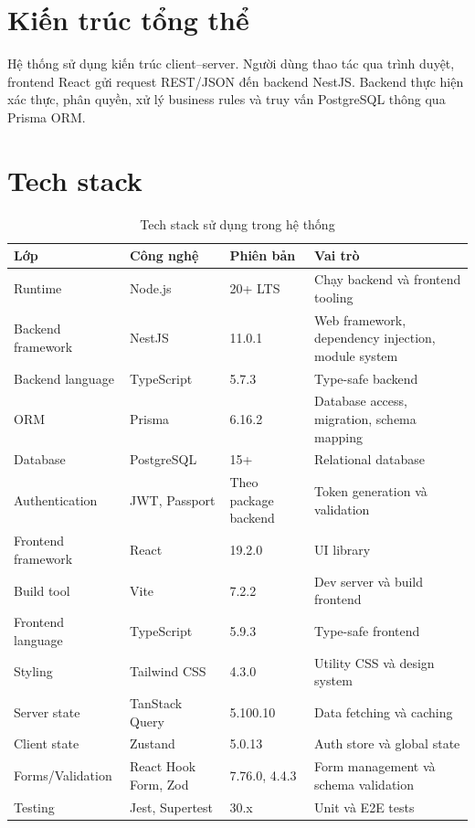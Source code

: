 \section{Kiến trúc tổng thể}

Hệ thống sử dụng kiến trúc client--server. Người dùng thao tác qua trình duyệt, frontend React gửi request REST/JSON đến backend NestJS. Backend thực hiện xác thực, phân quyền, xử lý business rules và truy vấn PostgreSQL thông qua Prisma ORM.



\section{Tech stack}

\begin{longtable}{|p{3cm}|p{4cm}|p{3cm}|p{5cm}|}
\caption{Tech stack sử dụng trong hệ thống}\\
\hline
\textbf{Lớp} & \textbf{Công nghệ} & \textbf{Phiên bản} & \textbf{Vai trò} \\
\hline
Runtime & Node.js & 20+ LTS & Chạy backend và frontend tooling \\
\hline
Backend framework & NestJS & 11.0.1 & Web framework, dependency injection, module system \\
\hline
Backend language & TypeScript & 5.7.3 & Type-safe backend \\
\hline
ORM & Prisma & 6.16.2 & Database access, migration, schema mapping \\
\hline
Database & PostgreSQL & 15+ & Relational database \\
\hline
Authentication & JWT, Passport & Theo package backend & Token generation và validation \\
\hline
Frontend framework & React & 19.2.0 & UI library \\
\hline
Build tool & Vite & 7.2.2 & Dev server và build frontend \\
\hline
Frontend language & TypeScript & 5.9.3 & Type-safe frontend \\
\hline
Styling & Tailwind CSS & 4.3.0 & Utility CSS và design system \\
\hline
Server state & TanStack Query & 5.100.10 & Data fetching và caching \\
\hline
Client state & Zustand & 5.0.13 & Auth store và global state \\
\hline
Forms/Validation & React Hook Form, Zod & 7.76.0, 4.4.3 & Form management và schema validation \\
\hline
Testing & Jest, Supertest & 30.x & Unit và E2E tests \\
\hline
\end{longtable}

